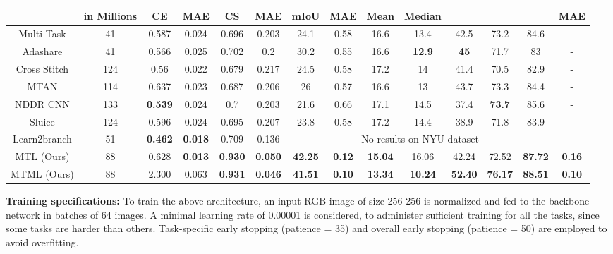 \documentclass[conference]{IEEEtran}
\begin{document}
\begin{table*}[ht]
{\begin{tabular}{cc|cccc|cccccccc}
\multicolumn{1}{c|}{} & in Millions & CE  & MAE  & CS  & MAE  & mIoU  & MAE  & Mean & Median &  &  &  & MAE  \\ \hline
\multicolumn{1}{c|}{Multi-Task \cite{sun2020adashare}} & 41 & 0.587 & 0.024 & 0.696 & 0.203 & 24.1 & 0.58 & 16.6 & 13.4 & 42.5 & 73.2 & 84.6 & - \\
\multicolumn{1}{c|}{Adashare \cite{sun2020adashare}} & 41 & 0.566 & 0.025 & 0.702 & 0.2 & 30.2 & 0.55 & 16.6 & \textbf{12.9} & \textbf{45} & 71.7 & 83 & - \\
\multicolumn{1}{c|}{Cross Stitch \cite{misra2016cross}} & 124 & 0.56 & 0.022 & 0.679 & 0.217 & 24.5 & 0.58 & 17.2 & 14 & 41.4 & 70.5 & 82.9 & - \\
\multicolumn{1}{c|}{MTAN \cite{liu2019end}} & 114 & 0.637 & 0.023 & 0.687 & 0.206 & 26 & 0.57 & 16.6 & 13 & 43.7 & 73.3 & 84.4 & - \\
\multicolumn{1}{c|}{NDDR CNN \cite{gao2019nddr}} & 133 & \textbf{0.539} & 0.024 & 0.7 & 0.203 & 21.6 & 0.66 & 17.1 & 14.5 & 37.4 & \textbf{73.7} & 85.6 & - \\
\multicolumn{1}{c|}{Sluice \cite{ruder2019latent}} & 124 & 0.596 & 0.024 & 0.695 & 0.207 & 23.8 & 0.58 & 17.2 & 14.4 & 38.9 & 71.8 & 83.9 & - \\
\multicolumn{1}{c|}{Learn2branch \cite{guo2020learning}} & 51 & \textbf{0.462} & \textbf{0.018} & 0.709 & 0.136 & \multicolumn{7}{c}{No results on NYU dataset} & \multicolumn{1}{l}{} \\ \hline
\multicolumn{1}{c|}{\ac{MTL} (Ours)} & 88 & 0.628 & \textbf{0.013} & \textbf{0.930}& \textbf{0.050}& \textbf{42.25} & \textbf{0.12} & \textbf{15.04} & 16.06 & 42.24 & 72.52 & \textbf{87.72} & \textbf{0.16} \\
\multicolumn{1}{c|}{\ac{MTML} (Ours)} & 88 & 2.300 & 0.063 & \textbf{0.931} & \textbf{0.046} & \textbf{41.51} & \textbf{0.10} & \textbf{13.34} & \textbf{10.24} & \textbf{52.40} & \textbf{76.17} &\textbf{88.51} & \textbf{0.10} \\ \hline
\end{tabular}}
\end{table*} 
\textbf{Training specifications:} To train the above architecture, an input RGB image of size 256  256 is normalized and fed to the backbone network in batches of 64 images.
A minimal learning rate of 0.00001 is considered, to administer sufficient training for all the tasks, since some tasks are harder than others. 
Task-specific early stopping (patience = 35) and overall early stopping (patience = 50) are employed to avoid overfitting. 
\end{document}
